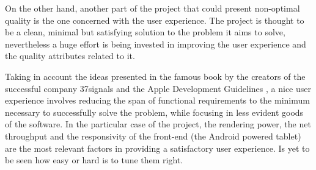 On the other hand, another part of the project that could present non-optimal quality is the one concerned with the user experience. The project is thought to be a clean, minimal but satisfying solution to the problem it aims to solve, nevertheless a huge effort is being invested in improving the user experience and the quality attributes related to it. 

Taking in account the ideas presented in the famous book by the creators of the successful company 37signals \cite{37signals} and the Apple Development Guidelines \cite{apple}, a nice user experience involves reducing the span of functional requirements to the minimum necessary to successfully solve the problem, while focusing in less evident goods of the software. In the particular case of the project, the rendering power, the net throughput and the responsivity of the front-end (the Android powered tablet) are the most relevant factors in providing a satisfactory user experience. Is yet to be seen how easy or hard is to tune them right.